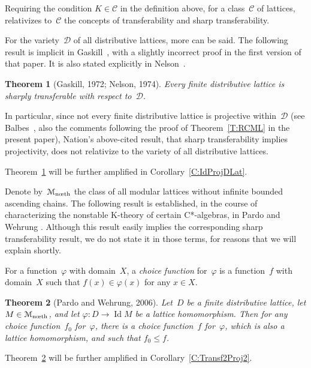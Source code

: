 \documentclass[reqno]{amsart}
\numberwithin{equation}{section}
\theoremstyle{plain}
\newtheorem{theorem}{Theorem}[section]
\theoremstyle{definition}
\theoremstyle{remark}
\numberwithin{figure}{section}
\numberwithin{table}{section}
\begin{document}
Requiring the condition $K\in{\mathcal{C}}$ in the definition above, for a class~${\mathcal{C}}$ of lattices, relativizes to~${\mathcal{C}}$ the concepts of transferability and sharp transferability.

For the variety~${\mathcal{D}}$ of all distributive lattices, more can be said.
The following result is implicit in Gaskill~\cite{Gask72a}, with a slightly incorrect proof in the first version of that paper.
It is also stated explicitly in Nelson~\cite{Nels74}.

\begin{theorem}[Gaskill, 1972; Nelson, 1974]\label{T:IdProjDLat}
Every finite distributive lattice is sharply transferable with respect to~${\mathcal{D}}$.
\end{theorem}

In particular, since not every finite distributive lattice is projective within~${\mathcal{D}}$ (see Balbes~\cite{Balb67}, also the comments following the proof of Theorem~\ref{T:RCML} in the present paper), Nation's above-cited result, that sharp transferability implies projectivity, does not relativize to the variety of all distributive lattices.

Theorem~\ref{T:IdProjDLat} will be further amplified in Corollary~\ref{C:IdProjDLat}.

Denote by~${{\mathcal{M}}_{\textup{n{\oe}th}}}$ the class of all modular lattices without infinite bounded ascending chains.
The following result is established, in the course of characterizing the nonstable K-theory of certain C*-algebras, in Pardo and Wehrung \cite[Theorem~4.3$'$]{ParWeh06}.
Although this result easily implies the corresponding sharp transferability result, we do not state it in those terms, for reasons that we will explain shortly.

For a function~${\varphi}$ with domain~$X$, a \emph{choice function} for~${\varphi}$ is a function~$f$ with domain~$X$ such that $f(x)\in{\varphi}(x)$ for any $x\in X$.

\begin{theorem}[Pardo and Wehrung, 2006]\label{T:ModNoeth}
Let~$D$ be a finite distributive lattice, let $M\in{{\mathcal{M}}_{\textup{n{\oe}th}}}$, and let ${\varphi}\colon D\to\operatorname{Id} M$ be a lattice homomorphism.
Then for any choice function~$f_0$ for~${\varphi}$, there is a choice function~$f$ for~${\varphi}$, which is also a lattice homomorphism, and such that $f_0\leq f$.
\end{theorem}

Theorem~\ref{T:ModNoeth} will be further amplified in Corollary~\ref{C:Transf2Proj2}.
\end{document}
